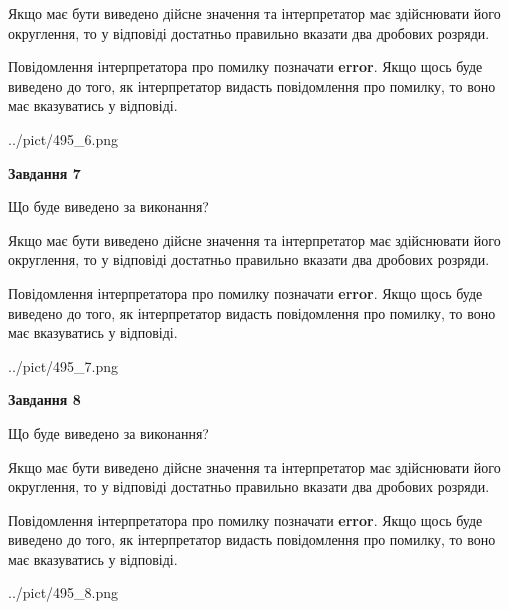 \documentclass[12pt, ukrainian]{article}
\begin{document}
{\begin {Large}
Якщо має бути виведено дійсне значення та інтерпретатор має здійснювати його округлення, 
то у відповіді достатньо правильно вказати два дробових розряди.

Повідомлення інтерпретатора про помилку позначати \textbf{error}.
Якщо щось буде виведено до того, як інтерпретатор видасть повідомлення про помилку, 
то воно має вказуватись у відповіді. \par

\begin{center}
	{../pict/495_6.png}
\end{center}
\newpage

{\begin {center}\textbf{Завдання 7}\end {center}}\par
Що буде виведено за виконання? \par

Якщо має бути виведено дійсне значення та інтерпретатор має здійснювати його округлення, 
то у відповіді достатньо правильно вказати два дробових розряди.

Повідомлення інтерпретатора про помилку позначати \textbf{error}.
Якщо щось буде виведено до того, як інтерпретатор видасть повідомлення про помилку, 
то воно має вказуватись у відповіді. \par

\begin{center}
	{../pict/495_7.png}
\end{center}
\newpage

{\begin {center}\textbf{Завдання 8}\end {center}}\par
Що буде виведено за виконання? \par

Якщо має бути виведено дійсне значення та інтерпретатор має здійснювати його округлення, 
то у відповіді достатньо правильно вказати два дробових розряди.

Повідомлення інтерпретатора про помилку позначати \textbf{error}.
Якщо щось буде виведено до того, як інтерпретатор видасть повідомлення про помилку, 
то воно має вказуватись у відповіді. \par

\begin{center}
	{../pict/495_8.png}
\end{center}
\newpage


\end{Large}}
\end{document}
